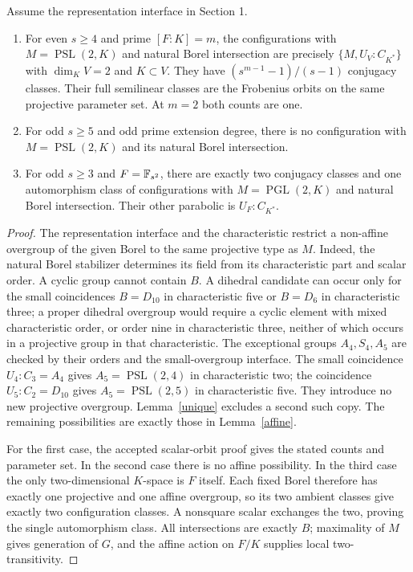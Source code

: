 \documentclass[11pt]{article}
\newcommand{\PSL}{\operatorname{PSL}}\newcommand{\PGL}{\operatorname{PGL}}
\begin{document}
\begin{theorem}\label{borelconfigs}
Assume the representation interface in Section 1.
\begin{enumerate}
\item For even $s\ge4$ and prime $[F:K]=m$, the configurations
with $M=\PSL(2,K)$ and natural Borel intersection are precisely
$\{M,U_V:C_{K^*}\}$ with $\dim_K V=2$ and $K\subset V$.
They have $(s^{m-1}-1)/(s-1)$ conjugacy classes. Their full
semilinear classes are the Frobenius orbits on the same projective
parameter set. At $m=2$ both counts are one.
\item For odd $s\ge5$ and odd prime extension degree, there is no
configuration with $M=\PSL(2,K)$ and its natural Borel intersection.
\item For odd $s\ge3$ and $F=\mathbb F_{s^2}$, there are exactly two conjugacy
classes and one automorphism class of configurations with
$M=\PGL(2,K)$ and natural Borel intersection. Their other parabolic
is $U_F:C_{K^*}$.
\end{enumerate}
\end{theorem}
\begin{proof}
The representation interface and the characteristic restrict a
non-affine overgroup of the given Borel to the same projective type
as $M$. Indeed, the natural Borel stabilizer determines its
field from its characteristic part and scalar order. A cyclic group
cannot contain $B$. A dihedral candidate can occur only for the
small coincidences $B=D_{10}$ in characteristic five or $B=D_6$
in characteristic three; a proper dihedral overgroup would require
a cyclic element with mixed characteristic order, or order nine in
characteristic three, neither of which occurs in a projective group
in that characteristic. The exceptional groups $A_4,S_4,A_5$
are checked by their orders and the small-overgroup interface.
The small coincidence $U_4:C_3=A_4$ gives $A_5=\PSL(2,4)$
in characteristic two; the coincidence $U_5:C_2=D_{10}$ gives
$A_5=\PSL(2,5)$ in characteristic five. They introduce no new
projective overgroup. Lemma~\ref{unique} excludes a second such
copy. The remaining possibilities are exactly those in
Lemma~\ref{affine}.

For the first case, the accepted scalar-orbit proof gives the stated
counts and parameter set. In the second case there is no affine
possibility. In the third case the only two-dimensional $K$-space
is $F$ itself. Each fixed Borel therefore has exactly one projective
and one affine overgroup, so its two ambient classes give exactly
two configuration classes. A nonsquare scalar exchanges the two,
proving the single automorphism class. All intersections are exactly
$B$; maximality of $M$ gives generation of $G$, and the affine action
on $F/K$ supplies local two-transitivity.
\end{proof}
\end{document}
